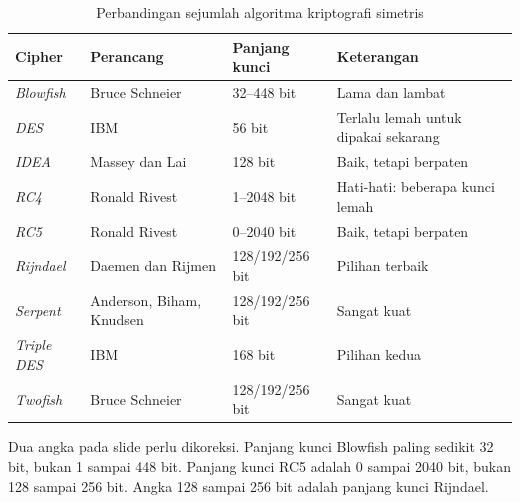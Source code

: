 \begin{table}[htbp]
    \centering
    \begin{tabularx}{\linewidth}{@{}l >{\raggedright\arraybackslash}X l >{\raggedright\arraybackslash}X@{}}
    \toprule
    \textbf{Cipher} & \textbf{Perancang} & \textbf{Panjang kunci} & \textbf{Keterangan} \\
    \midrule
    \textit{Blowfish}   & Bruce Schneier                & 32--448 bit     & Lama dan lambat \\
    \textit{DES}        & IBM                           & 56 bit          & Terlalu lemah untuk dipakai sekarang \\
    \textit{IDEA}       & Massey dan Lai                & 128 bit         & Baik, tetapi berpaten \\
    \textit{RC4}        & Ronald Rivest                 & 1--2048 bit     & Hati-hati: beberapa kunci lemah \\
    \textit{RC5}        & Ronald Rivest                 & 0--2040 bit     & Baik, tetapi berpaten \\
    \textit{Rijndael}   & Daemen dan Rijmen             & 128/192/256 bit & Pilihan terbaik \\
    \textit{Serpent}    & Anderson, Biham, Knudsen      & 128/192/256 bit & Sangat kuat \\
    \textit{Triple DES} & IBM                           & 168 bit         & Pilihan kedua \\
    \textit{Twofish}    & Bruce Schneier                & 128/192/256 bit & Sangat kuat \\
    \bottomrule
    \end{tabularx}
    \caption{Perbandingan sejumlah algoritma kriptografi simetris}
    \label{tab:perbandingan-cipher-simetris}
\end{table}

Dua angka pada slide perlu dikoreksi. Panjang kunci Blowfish paling sedikit 32 bit,
bukan 1 sampai 448 bit. Panjang kunci RC5 adalah 0 sampai 2040 bit, bukan 128
sampai 256 bit. Angka 128 sampai 256 bit adalah panjang kunci Rijndael.
